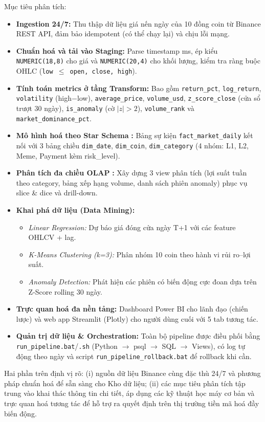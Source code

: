Mục tiêu phân tích:
\begin{itemize}
  \item \textbf{Ingestion 24/7:} Thu thập dữ liệu giá nến ngày của 10 đồng coin từ Binance REST API, đảm bảo idempotent (có thể chạy lại) và chịu lỗi mạng.
  \item \textbf{Chuẩn hoá và tải vào Staging:} Parse timestamp ms, ép kiểu \texttt{NUMERIC(18,8)} cho giá và \texttt{NUMERIC(20,4)} cho khối lượng, kiểm tra ràng buộc OHLC (\texttt{low $\leq$ open, close, high}).
  \item \textbf{Tính toán metrics ở tầng Transform:} Bao gồm \texttt{return\_pct}, \texttt{log\_return}, \texttt{volatility} (high$-$low), \texttt{average\_price}, \texttt{volume\_usd}, \texttt{z\_score\_close} (cửa sổ trượt 30 ngày), \texttt{is\_anomaly} (cờ $|z|>2$), \texttt{volume\_rank} và \texttt{market\_dominance\_pct}.
  \item \textbf{Mô hình hoá theo Star Schema} \cite{kimball2013}\textbf{:} Bảng sự kiện \texttt{fact\_market\_daily} kết nối với 3 bảng chiều \texttt{dim\_date}, \texttt{dim\_coin}, \texttt{dim\_category} (4 nhóm: L1, L2, Meme, Payment kèm risk\_level).
  \item \textbf{Phân tích đa chiều OLAP} \cite{chaudhuri1997}\textbf{:} Xây dựng 3 view phân tích (lợi suất tuần theo category, bảng xếp hạng volume, danh sách phiên anomaly) phục vụ slice \& dice và drill-down.
  \item \textbf{Khai phá dữ liệu (Data Mining):}
  \begin{itemize}
    \item \emph{Linear Regression:} Dự báo giá đóng cửa ngày T+1 với các feature OHLCV + lag.
    \item \emph{K-Means Clustering (k=3):} Phân nhóm 10 coin theo hành vi rủi ro--lợi suất.
    \item \emph{Anomaly Detection:} Phát hiện các phiên có biến động cực đoan dựa trên Z-Score rolling 30 ngày.
  \end{itemize}
  \item \textbf{Trực quan hoá đa nền tảng:} Dashboard Power BI cho lãnh đạo (chiến lược) và web app Streamlit (Plotly) cho người dùng cuối với 5 tab tương tác.
  \item \textbf{Quản trị dữ liệu \& Orchestration:} Toàn bộ pipeline được điều phối bằng \texttt{run\_pipeline.bat}/\texttt{.sh} (Python $\rightarrow$ psql $\rightarrow$ SQL $\rightarrow$ Views), có log tự động theo ngày và script \texttt{run\_pipeline\_rollback.bat} để rollback khi cần.
\end{itemize}

Hai phần trên định vị rõ: (i) nguồn dữ liệu Binance cùng đặc thù 24/7 và phương pháp chuẩn hoá để sẵn sàng cho Kho dữ liệu; (ii) các mục tiêu phân tích tập trung vào khai thác thông tin chi tiết, áp dụng các kỹ thuật học máy cơ bản và trực quan hoá tương tác để hỗ trợ ra quyết định trên thị trường tiền mã hoá đầy biến động.
